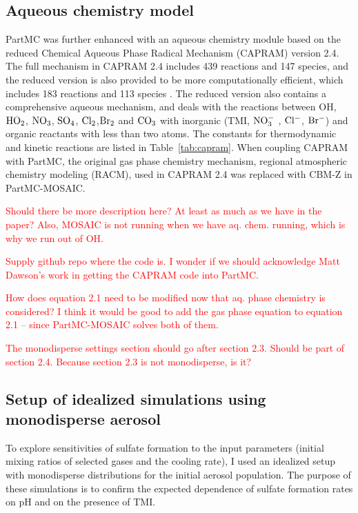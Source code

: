 \documentclass[edeposit,fullpage]{uiucthesis2009}
\begin{document}
\subsection{Aqueous chemistry model}
\label{section:aq-chem-model}
PartMC was further enhanced with an aqueous chemistry module based on
the reduced Chemical Aqueous Phase Radical Mechanism (CAPRAM) version
2.4. The full mechanism in CAPRAM 2.4 includes 439 reactions and 147
species, and the reduced version is also provided to be more
computationally efficient, which includes 183 reactions and 113
species \citep{Ervens2003}. The reduced version also contains a
comprehensive aqueous mechanism, and deals with the reactions between
OH, $\rm HO_2$, $\rm NO_3$, $\rm SO_4$, $\rm Cl_2$,$\rm Br_2$ and $\rm
CO_3$ with inorganic (TMI, $\rm NO_3^-$ , $\rm Cl^-$, $\rm Br^-$) and
organic reactants with less than two atoms. The constants for
thermodynamic and kinetic reactions are listed in
Table~\ref{tab:capram}. When coupling CAPRAM with PartMC, the original
gas phase chemistry mechanism, regional atmospheric chemistry modeling
(RACM), used in CAPRAM 2.4 was replaced with CBM-Z in PartMC-MOSAIC.

\textcolor{red}{Should there be more description here? At least as
  much as we have in the paper? Also, MOSAIC is not running when we
  have aq. chem. running, which is why we run out of OH.}

\textcolor{red}{Supply github repo where the code is. I wonder if we
  should acknowledge Matt Dawson's work in getting the CAPRAM code
  into PartMC.}

\textcolor{red}{How does equation 2.1 need to be modified now that
  aq. phase chemistry is considered? I think it would be good to add
  the gas phase equation to equation 2.1 -- since PartMC-MOSAIC solves
  both of them.}


\textcolor{red}{The monodisperse settings section should go after
  section 2.3. Should be part of section 2.4. Because section 2.3 is
  not monodisperse, is it?}

\subsection{Setup of idealized simulations using monodisperse aerosol}
To explore sensitivities of sulfate formation to the input parameters
(initial mixing ratios of selected gases and the cooling rate), I used
an idealized setup with monodisperse distributions for the initial
aerosol population. The purpose of these simulations is to confirm the
expected dependence of sulfate formation rates on pH and on the
presence of TMI.
\end{document}
